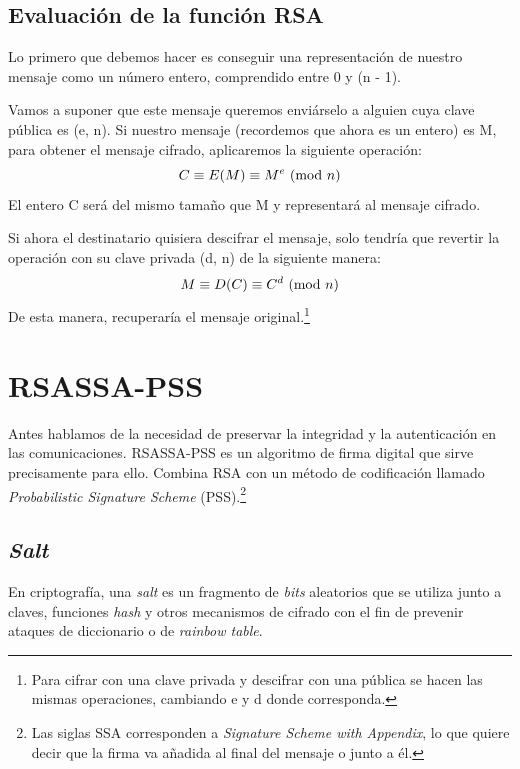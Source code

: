 \subsection{Evaluación de la función RSA}

Lo primero que debemos hacer es conseguir una representación de nuestro mensaje como un número entero, comprendido entre 0 y (n - 1).

Vamos a suponer que este mensaje queremos enviárselo a alguien cuya clave pública es (e, n). Si nuestro mensaje (recordemos que ahora es un entero) es M, para obtener el mensaje cifrado, aplicaremos la siguiente operación:
\[ C \equiv E(M) \equiv M^e \ (\mathrm{mod}\ n) \]
El entero C será del mismo tamaño que M y representará al mensaje cifrado.

Si ahora el destinatario quisiera descifrar el mensaje, solo tendría que revertir la operación con su clave privada (d, n) de la siguiente manera:
\[ M \equiv D(C) \equiv C^d \ (\mathrm{mod}\ n) \]
De esta manera, recuperaría el mensaje original.\footnote{Para cifrar con una clave privada y descifrar con una pública se hacen las mismas operaciones, cambiando e y d donde corresponda.} \emph{\parencite{Reference12}}


\section{RSASSA-PSS}

\label{RSASSA-PSS}

Antes hablamos de la necesidad de preservar la integridad y la autenticación en las comunicaciones. RSASSA-PSS es un algoritmo de firma digital que sirve precisamente para ello. Combina RSA con un método de codificación llamado \emph{Probabilistic Signature Scheme} (PSS).\footnote{Las siglas SSA corresponden a \emph{Signature Scheme with Appendix}, lo que quiere decir que la firma va añadida al final del mensaje o junto a él.}

\subsection{\emph{Salt}}

En criptografía, una \emph{salt} es un fragmento de \emph{bits} aleatorios que se utiliza junto a claves, funciones \emph{hash} y otros mecanismos de cifrado con el fin de prevenir ataques de diccionario o de \emph{rainbow table}. \emph{\parencite{Reference32}}

